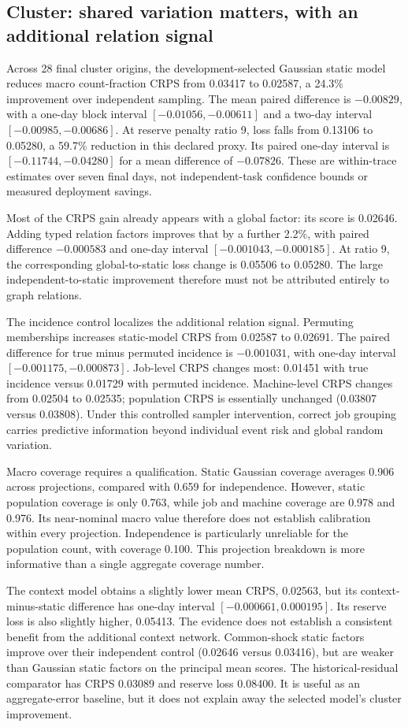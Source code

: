 \subsection{Cluster: shared variation matters, with an additional relation signal}
Across 28 final cluster origins, the development-selected Gaussian static
model reduces macro count-fraction CRPS from 0.03417 to 0.02587, a 24.3\%
improvement over independent sampling. The mean paired difference is
$-0.00829$, with a one-day block interval $[-0.01056,-0.00611]$ and a two-day
interval $[-0.00985,-0.00686]$. At reserve penalty ratio 9, loss falls from
0.13106 to 0.05280, a 59.7\% reduction in this declared proxy. Its paired
one-day interval is $[-0.11744,-0.04280]$ for a mean difference of $-0.07826$.
These are within-trace estimates over seven final days, not independent-task
confidence bounds or measured deployment savings.

Most of the CRPS gain already appears with a global factor: its score is
0.02646. Adding typed relation factors improves that by a further 2.2\%, with
paired difference $-0.000583$ and one-day interval
$[-0.001043,-0.000185]$. At ratio 9, the corresponding global-to-static loss
change is 0.05506 to 0.05280. The large independent-to-static improvement
therefore must not be attributed entirely to graph relations.

The incidence control localizes the additional relation signal. Permuting
memberships increases static-model CRPS from 0.02587 to 0.02691. The paired
difference for true minus permuted incidence is $-0.001031$, with one-day
interval $[-0.001175,-0.000873]$. Job-level CRPS changes most: 0.01451 with
true incidence versus 0.01729 with permuted incidence. Machine-level CRPS
changes from 0.02504 to 0.02535; population CRPS is essentially unchanged
(0.03807 versus 0.03808). Under this controlled sampler intervention, correct
job grouping carries predictive information beyond individual event risk and
global random variation.

Macro coverage requires a qualification. Static Gaussian coverage averages
0.906 across projections, compared with 0.659 for independence. However,
static population coverage is only 0.763, while job and machine coverage are
0.978 and 0.976. Its near-nominal macro value therefore does not establish
calibration within every projection. Independence is particularly unreliable
for the population count, with coverage 0.100. This projection breakdown is
more informative than a single aggregate coverage number.

The context model obtains a slightly lower mean CRPS, 0.02563, but its
context-minus-static difference has one-day interval
$[-0.000661,0.000195]$. Its reserve loss is also slightly higher, 0.05413.
The evidence does not establish a consistent benefit from the additional
context network. Common-shock static factors improve over their independent
control (0.02646 versus 0.03416), but are weaker than Gaussian static factors
on the principal mean scores. The historical-residual comparator has CRPS
0.03089 and reserve loss 0.08400. It is useful as an aggregate-error baseline,
but it does not explain away the selected model's cluster improvement.
